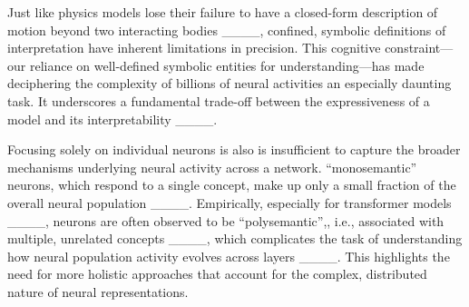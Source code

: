 Just like physics models lose their failure to have a closed-form description of motion beyond two interacting bodies ____, confined, symbolic definitions of interpretation have inherent limitations in precision. This cognitive constraint—our reliance on well-defined symbolic entities for understanding—has made deciphering the complexity of billions of neural activities an especially daunting task. It underscores a fundamental trade-off between the expressiveness of a model and its interpretability ____.

Focusing solely on individual neurons is also is insufficient to capture the broader mechanisms underlying neural activity across a network. ``monosemantic'' neurons, which respond to a single concept, make up only a small fraction of the overall neural population ____. Empirically, especially for transformer models ____, neurons are often observed to be ``polysemantic'',, i.e., associated with multiple, unrelated concepts ____, which complicates the task of understanding how neural population activity evolves across layers ____. This highlights the need for more holistic approaches that account for the complex, distributed nature of neural representations.




